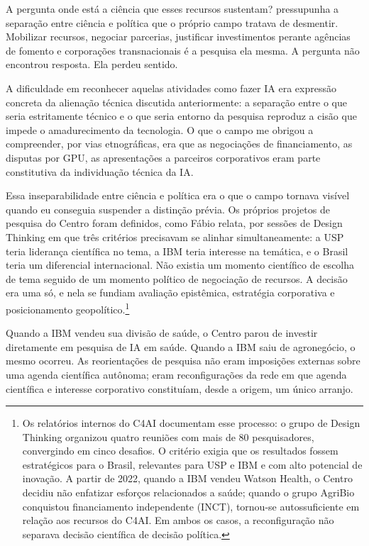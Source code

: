 A pergunta onde está a ciência que esses recursos sustentam? pressupunha a separação entre ciência e política que o próprio campo tratava de desmentir. Mobilizar recursos, negociar parcerias, justificar investimentos perante agências de fomento e corporações transnacionais é a pesquisa ela mesma. A pergunta não encontrou resposta. Ela perdeu sentido.

A dificuldade em reconhecer aquelas atividades como fazer IA era expressão concreta da alienação técnica discutida anteriormente: a separação entre o que seria estritamente técnico e o que seria entorno da pesquisa reproduz a cisão que impede o amadurecimento da tecnologia. O que o campo me obrigou a compreender, por vias etnográficas, era que as negociações de financiamento, as disputas por GPU, as apresentações a parceiros corporativos eram parte constitutiva da individuação técnica da IA.

Essa inseparabilidade entre ciência e política era o que o campo tornava visível quando eu conseguia suspender a distinção prévia. Os próprios projetos de pesquisa do Centro foram definidos, como Fábio relata, por sessões de Design Thinking em que três critérios precisavam se alinhar simultaneamente: a USP teria liderança científica no tema, a IBM teria interesse na temática, e o Brasil teria um diferencial internacional. Não existia um momento científico de escolha de tema seguido de um momento político de negociação de recursos. A decisão era uma só, e nela se fundiam avaliação epistêmica, estratégia corporativa e posicionamento geopolítico.\footnote{Os relatórios internos do C4AI documentam esse processo: o grupo de Design Thinking organizou quatro reuniões com mais de 80 pesquisadores, convergindo em cinco desafios. O critério exigia que os resultados fossem estratégicos para o Brasil, relevantes para USP e IBM e com alto potencial de inovação. A partir de 2022, quando a IBM vendeu Watson Health, o Centro decidiu não enfatizar esforços relacionados a saúde; quando o grupo AgriBio conquistou financiamento independente (INCT), tornou-se autossuficiente em relação aos recursos do C4AI. Em ambos os casos, a reconfiguração não separava decisão científica de decisão política.}

Quando a IBM vendeu sua divisão de saúde, o Centro parou de investir diretamente em pesquisa de IA em saúde. Quando a IBM saiu de agronegócio, o mesmo ocorreu. As reorientações de pesquisa não eram imposições externas sobre uma agenda científica autônoma; eram reconfigurações da rede em que agenda científica e interesse corporativo constituíam, desde a origem, um único arranjo.

